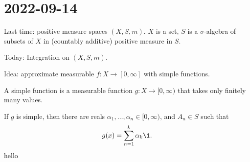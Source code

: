 \section{2022-09-14}

Last time: positive measure spaces $(X, S, m)$. $X$ is a set, $S$ is a $\sigma$-algebra of subsets of $X$ in (countably additive) positive measure in $S$. 

Today: Integration on $(X, S, m)$. 

Idea: approximate measurable $f : X \to [0, \infty]$ with simple functions. 

\begin{definition}
	A simple function is a measurable function $g : X \to [0, \infty)$ that takes only finitely many values. 
\end{definition}

If $g$ is simple, then there are reals $\alpha_1, \ldots, \alpha_n \in [0, \infty)$, and $A_n \in S$ such that 
\[
	g(x) = \sum_{n = 1}^{k} \alpha_k \1 .
\]
hello 

